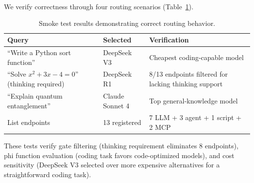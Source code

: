 We verify correctness through four routing scenarios (Table~\ref{tab:smoke_tests}).

\begin{table}[h]
\centering
\caption{Smoke test results demonstrating correct routing behavior.}
\label{tab:smoke_tests}
\small
\begin{tabular}{p{4cm}lp{4cm}}
\toprule
\textbf{Query} & \textbf{Selected} & \textbf{Verification} \\
\midrule
``Write a Python sort function'' & DeepSeek V3 & Cheapest coding-capable model \\
``Solve $x^2 + 3x - 4 = 0$'' (thinking required) & DeepSeek R1 & 8/13 endpoints filtered for lacking thinking support \\
``Explain quantum entanglement'' & Claude Sonnet 4 & Top general-knowledge model \\
List endpoints & 13 registered & 7 LLM + 3 agent + 1 script + 2 MCP \\
\bottomrule
\end{tabular}
\end{table}

These tests verify gate filtering (thinking requirement eliminates 8 endpoints), phi function evaluation (coding task favors code-optimized models), and cost sensitivity (DeepSeek V3 selected over more expensive alternatives for a straightforward coding task).

